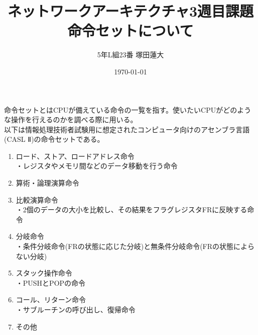 \documentclass[a4j,uplatex]{jsarticle}
\title{\vspace{-5cm}ネットワークアーキテクチャ3週目課題命令セットについて}
\author{5年L組23番 塚田蓮大}
\date{\today}
\numberwithin{equation}{section}
\begin{document}
	\maketitle

	命令セットとはCPUが備えている命令の一覧を指す。使いたいCPUがどのような操作を行えるのかを調べる際に用いる。\\
	以下は情報処理技術者試験用に想定されたコンピュータ向けのアセンブラ言語(CASL Ⅱ)の命令セットである。
	\begin{enumerate}
		\item ロード、ストア、ロードアドレス命令 \mbox{}\\
			・レジスタやメモリ間などのデータ移動を行う命令
		\item 算術・論理演算命令
		\item 比較演算命令 \mbox{}\\
			・2個のデータの大小を比較し、その結果をフラグレジスタFRに反映する命令
		\item 分岐命令 \mbox{}\\
			・条件分岐命令(FRの状態に応じた分岐)と無条件分岐命令(FRの状態によらない分岐)
		\item スタック操作命令 \mbox{}\\
			・PUSHとPOPの命令
		\item コール、リターン命令 \mbox{}\\
			・サブルーチンの呼び出し、復帰命令
		\item その他
	\end{enumerate}
\end{document}
